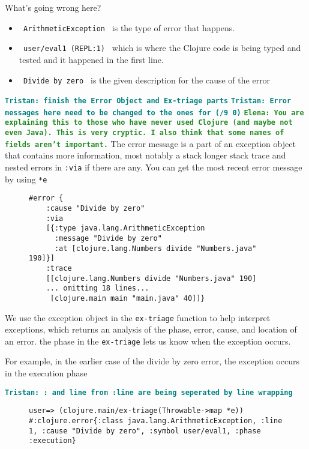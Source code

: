 \documentclass[12pt]{article}
\newcommand{\comment}[1]{{\bf \tt  {#1}}}
\newcommand{\emcomment}[1]{\textcolor{ForestGreen}{\comment{Elena: {#1}}}}
\newcommand{\tkcomment}[1]{\textcolor{Teal}{\comment{Tristan: {#1}}}}
\begin{document}
What’s going wrong here?
	\begin{itemize}
		\item \texttt{ ArithmeticException } is the type of error that happens.
		\item \texttt{ user/eval1 (REPL:1) } which is where the Clojure code is being typed and tested and it happened in the first line.
		\item \texttt{ Divide by zero } is the given description for the cause of the error
	\end{itemize}

	\tkcomment{finish the Error Object and Ex-triage parts}
	\tkcomment{Error messages here need to be changed to the ones for (/9 0)}
\emcomment{You are explaining this to those who have never used Clojure (and maybe not even Java). This is very cryptic. I also think that some names of fields aren't important.}
	The error message is a part of an exception object that contains more information,
	most notably a stack longer stack trace and nested errors in \texttt{:via} if there are any. You can get the most recent error message by using \texttt{*e}
	\begin{figure}[h]
		\centering
		\begin{lstlisting}[breaklines=true, basicstyle=\ttfamily]
#error {
	:cause "Divide by zero"
	:via
	[{:type java.lang.ArithmeticException
	  :message "Divide by zero"
	  :at [clojure.lang.Numbers divide "Numbers.java" 190]}]
	:trace
	[[clojure.lang.Numbers divide "Numbers.java" 190]
	... omitting 18 lines...
	 [clojure.main main "main.java" 40]]}

		\end{lstlisting}
	\end{figure}
	

	We use the exception object in the \texttt{ex-triage} function to help interpret exceptions, which returns an analysis of the phase, error, cause, and location of an error.
	 the phase in the \texttt{ex-triage} lets us know when the exception occurs.
	
	For example, in the earlier case of the divide by zero error, the exception occurs in the execution phase

	\tkcomment{: and line from :line are being seperated by line wrapping}

	\begin{figure}[h]
		\centering
		\begin{lstlisting}[breaklines=true, basicstyle=\ttfamily]
user=> (clojure.main/ex-triage(Throwable->map *e))
#:clojure.error{:class java.lang.ArithmeticException, :line 1, :cause "Divide by zero", :symbol user/eval1, :phase :execution}
		\end{lstlisting}
	\end{figure}
\end{document}
